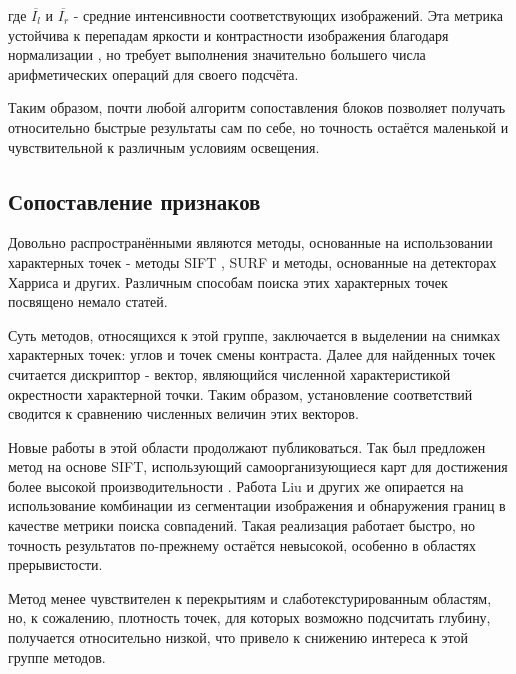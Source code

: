 где $\overline{I_l}$ и $\overline{I_r}$ - средние интенсивности соответствующих изображений. Эта метрика устойчива к перепадам яркости и контрастности изображения благодаря нормализации \cite{ncceval}, 
но требует выполнения значительно большего числа арифметических операций для своего подсчёта. 

Таким образом, почти любой алгоритм сопоставления блоков позволяет получать относительно быстрые результаты сам по себе, но точность остаётся маленькой и чувствительной к различным условиям освещения. 

\subsection{Сопоставление признаков}
Довольно распространёнными являются методы, основанные на использовании характерных точек - методы SIFT \cite{sift}, SURF \cite{surf} 
и методы, основанные на детекторах Харриса и других. Различным способам поиска этих характерных точек посвящено немало статей. 

Суть методов, относящихся к этой группе, заключается в выделении на снимках характерных точек: углов и точек смены контраста. Далее 
для найденных точек считается дискриптор - вектор, являющийся численной характеристикой окрестности характерной точки. Таким образом,
установление соответствий сводится к сравнению численных величин этих векторов. 

Новые работы в этой области продолжают публиковаться. Так был предложен метод на основе SIFT, использующий самоорганизующиеся карт для 	%
достижения более высокой производительности \cite{modsift}. Работа Liu и других \cite{ekstrand2015high} же опирается на использование комбинации из сегментации 
изображения и обнаружения границ в качестве метрики поиска совпадений. Такая реализация работает быстро, но точность результатов по-прежнему остаётся
невысокой, особенно в областях прерывистости. %

Метод менее чувствителен к перекрытиям и слаботекстурированным областям, 
но, к сожалению, плотность точек, для которых возможно подсчитать глубину, получается относительно низкой, что привело к снижению интереса 
к этой группе методов.

